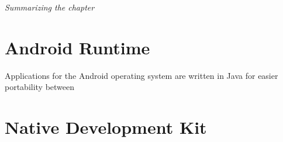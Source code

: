 \textit{Summarizing the chapter}

\section{Android Runtime}

Applications for the Android operating system are written in Java for easier portability between \cite[p.~33]{nolan2012decompiling}

\section{Native Development Kit}



